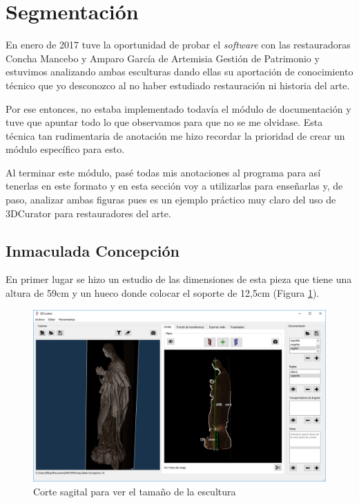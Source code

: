 \section{Segmentación}

En enero de 2017 tuve la oportunidad de probar el \textit{software} con las restauradoras Concha Mancebo y Amparo García de Artemisia Gestión de Patrimonio y estuvimos analizando ambas esculturas dando ellas su aportación de conocimiento técnico que yo desconozco al no haber estudiado restauración ni historia del arte.

Por ese entonces, no estaba implementado todavía el módulo de documentación y tuve que apuntar todo lo que observamos para que no se me olvidase. Esta técnica tan rudimentaria de anotación me hizo recordar la prioridad de crear un módulo específico para esto.

Al terminar este módulo, pasé todas mis anotaciones al programa para así tenerlas en este formato y en esta sección voy a utilizarlas para enseñarlas y, de paso, analizar ambas figuras pues es un ejemplo práctico muy claro del uso de 3DCurator para restauradores del arte.

\subsection{Inmaculada Concepción}

En primer lugar se hizo un estudio de las dimensiones de esta pieza que tiene una altura de 59cm y un hueco donde colocar el soporte de 12,5cm (Figura \ref{fig:resultados/documentacion/inmaculada-concepcion/sagital}).

\begin{figure}[H]
	\centering
	\includegraphics[width=12.5cm]{imagenes/resultados/documentacion/inmaculada-concepcion/sagital}
	\caption{Corte sagital para ver el tamaño de la escultura}
	\label{fig:resultados/documentacion/inmaculada-concepcion/sagital}
\end{figure}

